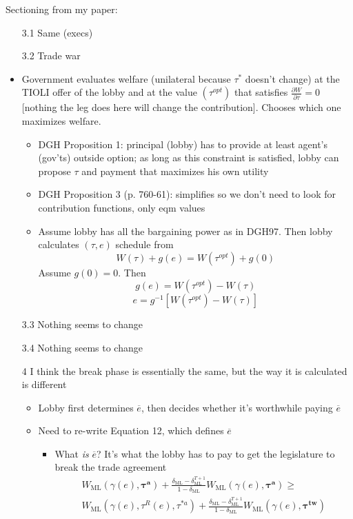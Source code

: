 \documentclass[12pt]{article}
\newcommand{\ov}{\overline}
\newcommand{\bta}{\bm{\tau^a}}
\newcommand{\btw}{\bm{\tau^{tw}}}
\newcommand{\ga}{\gamma}
\newcommand{\de}{\delta}
\begin{document}
Sectioning from my paper:
\begin{itemize}
	\item[3.1] Same (execs)
	\item[3.2] Trade war
	\item Government evaluates welfare (unilateral because $\tau^*$ doesn't change) at the TIOLI offer of the lobby and at the value $\left(\tau^{opt}\right)$ that satisfies $\frac{\partial W}{\partial \tau} = 0$ [nothing the leg does here will change the contribution]. Chooses which one maximizes welfare.
		\begin{itemize}
			\item DGH Proposition 1: principal (lobby) has to provide at least agent's (gov'ts) outside option; as long as this constraint is satisfied, lobby can propose $\tau$ and payment that maximizes his own utility
			\item DGH Proposition 3 (p. 760-61): simplifies so we don't need to look for contribution functions, only eqm values
			\item Assume lobby has all the bargaining power as in DGH97. Then lobby calculates $\left(\tau,e\right)$ schedule from
								\[
									W(\tau) +g(e) = W(\tau^{opt}) +g(0)
								\]
								Assume $g(0) = 0$. Then
								\[
									g(e) = W(\tau^{opt}) - W(\tau)
								\]
								\[
									e = g^{-1}\left[W(\tau^{opt}) - W(\tau)\right]
								\]
		\end{itemize}
	\item[3.3] Nothing seems to change
	\item[3.4] Nothing seems to change
	\item[4] I think the break phase is essentially the same, but the way it is calculated is different
				\begin{itemize}
					\item Lobby first determines $\ov{e}$, then decides whether it's worthwhile paying $\ov{e}$
					\item Need to re-write Equation 12, which defines $\ov{e}$
						\begin{itemize}	
							\item What \textit{is} $\ov{e}$? It's what the lobby has to pay to get the legislature to break the trade agreement
							\begin{multline}
						W_{\text{ML}}(\ga(e),\bta) + \frac{\de_\text{ML} - \de_\text{ML}^{T+1}}{1-\de_\text{ML}} W_\text{ML}(\ga(e),\bta)  \geq \\
	W_{\text{ML}}(\ga(e),\tau^R(e),\tau^{*a}) + \frac{\de_\text{ML} - \de_\text{ML}^{T+1}}{1-\de_\text{ML}} W_{\text{ML}}(\ga(e),\btw)

\end{multline}
\end{itemize}
\end{itemize}
\end{itemize}
\end{document}

